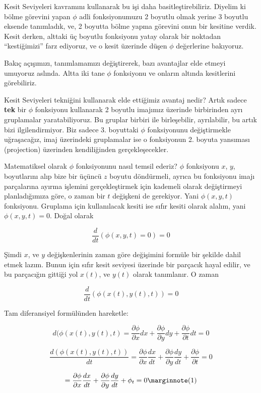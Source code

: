\documentclass[12pt,fleqn]{article}\usepackage{../../common}
\begin{document}
Kesit Seviyeleri kavramını kullanarak bu işi daha
basitleştirebiliriz. Diyelim ki bölme görevini yapan $\phi$ adli
fonksiyonumuzu 2 boyutlu olmak yerine 3 boyutlu eksende tanımladık,
ve, 2 boyutta bölme yapma görevini onun bir kesitine verdik. Kesit
derken, alttaki üç boyutlu fonksiyonu yatay olarak bir noktadan
``kestiğimizi'' farz ediyoruz, ve o kesit üzerinde düşen $\phi$
değerlerine bakıyoruz.

Bakıç açışımızı, tanımlamamızı değiştirerek, bazı avantajlar elde
etmeyi umuyoruz aslında. Altta iki tane $\phi$ fonksiyonu ve onların
altında kesitlerini görebiliriz.


Kesit Seviyeleri tekniğini kullanarak elde ettiğimiz avantaj nedir?
Artık sadece \textbf{tek} bir $\phi$ fonksiyonu kullanarak 2 boyutlu
imajımız üzerinde birbirinden ayrı gruplamalar yaratabiliyoruz. Bu
gruplar birbiri ile birleşebilir, ayrılabilir, bu artık bizi
ilgilendirmiyor. Biz sadece 3. boyuttaki $\phi$ fonksiyonunu
değiştirmekle uğraşacağız, imaj üzerindeki gruplamalar ise o
fonksiyonun 2. boyuta yansıması (projection) üzerinden kendiliğinden
gerçekleşecekler.

Matematiksel olarak $\phi$ fonksiyonunu nasıl temsil ederiz? $\phi$
fonksiyonu $x$, $y$, boyutlarını alıp bize bir üçüncü $z$ boyutu
döndürmeli, ayrıca bu fonksiyonu imajı parçalarına ayırma işlemini
gerçekleştirmek için kademeli olarak değiştirmeyi planladığımıza göre,
o zaman bir $t$ değişkeni de gerekiyor. Yani $\phi(x,y,t)$
fonksiyonu. Gruplama için kullanılacak kesiti ise sıfır kesiti olarak
alalım, yani $\phi(x,y,t) = 0$. Doğal olarak

$$ \frac{d}{dt}(\phi(x,y,t) = 0) = 0 $$

Şimdi $x$, ve $y$ değişkenlerinin zaman göre değişimini formüle bir
şekilde dahil etmek lazım. Bunun için sıfır kesit seviyesi üzerinde
bir parçacık hayal edilir, ve bu parçacığın gittiği yol $x(t)$, ve
$y(t)$ olarak tanımlanır. O zaman

$$ \frac{d}{dt}(\phi(x(t),y(t),t)) = 0 $$

Tam diferansiyel formülünden hareketle:

$$ 
d(\phi(x(t),y(t),t) = 
\frac{\partial \phi}{\partial x}dx + 
\frac{\partial \phi}{\partial y}dy + 
\frac{\partial \phi}{\partial t}dt  = 0
 $$

$$ 
\frac{d(\phi(x(t),y(t),t))}{dt} = 
\frac{\partial \phi}{\partial x}\frac{dx}{dt} + 
\frac{\partial \phi}{\partial y}\frac{dy}{dt} + 
\frac{\partial \phi}{\partial t} = 0
 $$

$$
 = 
\frac{\partial \phi}{\partial x}\frac{dx}{dt} + 
\frac{\partial \phi}{\partial y}\frac{dy}{dt} + 
\phi_t = 0
\mlabel{1}
$$
\end{document}
